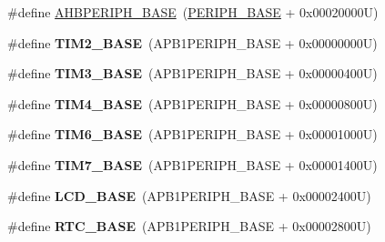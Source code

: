 \begin{DoxyCompactItemize}
\item 
\#define \hyperlink{group___peripheral__memory__map_ga92eb5d49730765d2abd0f5b09548f9f5}{A\-H\-B\-P\-E\-R\-I\-P\-H\-\_\-\-B\-A\-S\-E}~(\hyperlink{group___peripheral__memory__map_ga9171f49478fa86d932f89e78e73b88b0}{P\-E\-R\-I\-P\-H\-\_\-\-B\-A\-S\-E} + 0x00020000\-U)
\item 
\hypertarget{group___peripheral__memory__map_ga00d0fe6ad532ab32f0f81cafca8d3aa5}{\#define {\bfseries T\-I\-M2\-\_\-\-B\-A\-S\-E}~(A\-P\-B1\-P\-E\-R\-I\-P\-H\-\_\-\-B\-A\-S\-E + 0x00000000\-U)}\label{group___peripheral__memory__map_ga00d0fe6ad532ab32f0f81cafca8d3aa5}

\item 
\hypertarget{group___peripheral__memory__map_gaf0c34a518f87e1e505cd2332e989564a}{\#define {\bfseries T\-I\-M3\-\_\-\-B\-A\-S\-E}~(A\-P\-B1\-P\-E\-R\-I\-P\-H\-\_\-\-B\-A\-S\-E + 0x00000400\-U)}\label{group___peripheral__memory__map_gaf0c34a518f87e1e505cd2332e989564a}

\item 
\hypertarget{group___peripheral__memory__map_ga56e2d44b0002f316527b8913866a370d}{\#define {\bfseries T\-I\-M4\-\_\-\-B\-A\-S\-E}~(A\-P\-B1\-P\-E\-R\-I\-P\-H\-\_\-\-B\-A\-S\-E + 0x00000800\-U)}\label{group___peripheral__memory__map_ga56e2d44b0002f316527b8913866a370d}

\item 
\hypertarget{group___peripheral__memory__map_ga8268ec947929f192559f28c6bf7d1eac}{\#define {\bfseries T\-I\-M6\-\_\-\-B\-A\-S\-E}~(A\-P\-B1\-P\-E\-R\-I\-P\-H\-\_\-\-B\-A\-S\-E + 0x00001000\-U)}\label{group___peripheral__memory__map_ga8268ec947929f192559f28c6bf7d1eac}

\item 
\hypertarget{group___peripheral__memory__map_ga0ebf54364c6a2be6eb19ded6b18b6387}{\#define {\bfseries T\-I\-M7\-\_\-\-B\-A\-S\-E}~(A\-P\-B1\-P\-E\-R\-I\-P\-H\-\_\-\-B\-A\-S\-E + 0x00001400\-U)}\label{group___peripheral__memory__map_ga0ebf54364c6a2be6eb19ded6b18b6387}

\item 
\hypertarget{group___peripheral__memory__map_ga017749aad23300240ef5ac4c3d5ca750}{\#define {\bfseries L\-C\-D\-\_\-\-B\-A\-S\-E}~(A\-P\-B1\-P\-E\-R\-I\-P\-H\-\_\-\-B\-A\-S\-E + 0x00002400\-U)}\label{group___peripheral__memory__map_ga017749aad23300240ef5ac4c3d5ca750}

\item 
\hypertarget{group___peripheral__memory__map_ga4265e665d56225412e57a61d87417022}{\#define {\bfseries R\-T\-C\-\_\-\-B\-A\-S\-E}~(A\-P\-B1\-P\-E\-R\-I\-P\-H\-\_\-\-B\-A\-S\-E + 0x00002800\-U)}\label{group___peripheral__memory__map_ga4265e665d56225412e57a61d87417022}


\end{DoxyCompactItemize}
